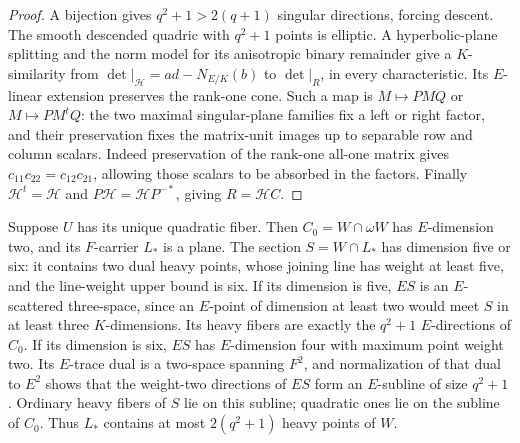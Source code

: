 \documentclass[12pt,letterpaper,onecolumn]{article}
\theoremstyle{definition}
\theoremstyle{remark}
\begin{document}
\begin{proof}
A bijection gives \(q^2+1>2(q+1)\) singular directions, forcing descent. The smooth descended quadric with \(q^2+1\) points is elliptic.
A hyperbolic-plane splitting and the norm model for its anisotropic binary remainder give a \(K\)-similarity from \(\det|_{\mathcal H}=ad-N_{E/K}(b)\) to \(\det|_R\), in every characteristic.
Its \(E\)-linear extension preserves the rank-one cone. Such a map is \(M\mapsto PMQ\) or \(M\mapsto PM^tQ\): the two maximal singular-plane families fix a left or right factor, and their preservation fixes the matrix-unit images up to separable row and column scalars.
Indeed preservation of the rank-one all-one matrix gives \(c_{11}c_{22}=c_{12}c_{21}\), allowing those scalars to be absorbed in the factors.
Finally \(\mathcal H^t=\mathcal H\) and \(P\mathcal H=\mathcal H P^{-*}\), giving \(R=\mathcal H C\).
\end{proof}

Suppose \(U\) has its unique quadratic fiber. Then \(C_0=W\cap\omega W\) has \(E\)-dimension two, and its \(F\)-carrier \(L_*\) is a plane.
The section \(S=W\cap L_*\) has dimension five or six: it contains two dual heavy points, whose joining line has weight at least five, and the line-weight upper bound is six.
If its dimension is five, \(ES\) is an \(E\)-scattered three-space, since an \(E\)-point of dimension at least two would meet \(S\) in at least three \(K\)-dimensions. Its heavy fibers are exactly the \(q^2+1\) \(E\)-directions of \(C_0\).
If its dimension is six, \(ES\) has \(E\)-dimension four with maximum point weight two. Its \(E\)-trace dual is a two-space spanning \(F^2\), and normalization of that dual to \(E^2\) shows that the weight-two directions of \(ES\) form an \(E\)-subline of size \(q^2+1\).
Ordinary heavy fibers of \(S\) lie on this subline; quadratic ones lie on the subline of \(C_0\). Thus \(L_*\) contains at most \(2(q^2+1)\) heavy points of \(W\).
\end{document}
